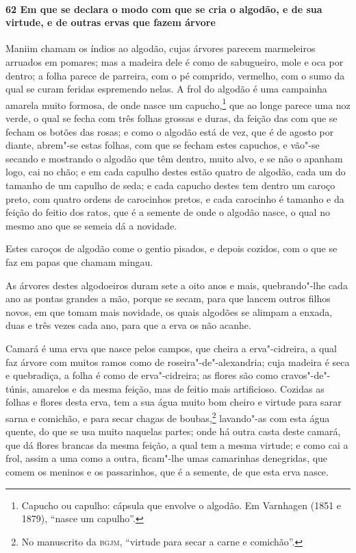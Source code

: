 \begin{linenumbers}
\paragraph{62 Em que se declara o modo com que se cria o algodão, e de sua virtude, e de
outras ervas que fazem árvore}\quad
Maniim chamam os índios ao algodão, cujas árvores parecem marmeleiros arruados em pomares;
mas a madeira dele é como de sabugueiro, mole e oca por dentro; a folha parece de
parreira, com o pé comprido, vermelho, com o sumo da qual se curam feridas espremendo
nelas. A frol do algodão é uma campainha amarela muito formosa, de onde nasce um
capucho,\footnote{ Capucho ou capulho: cápsula que envolve o algodão. 
Em Varnhagen (1851 e 1879), ``nasce um capulho''.} que ao longe parece
uma noz verde, o qual se fecha com três folhas grossas e duras, da feição das com que se
fecham os botões das rosas; e como o algodão está de vez, que é de agosto por diante,
abrem"-se estas folhas, com que se fecham estes capuchos, e vão"-se secando e mostrando o
algodão que têm dentro, muito alvo, e se não o apanham logo, cai no chão; e em cada
capulho destes estão quatro de algodão, cada um do tamanho de um capulho de seda; e cada
capucho destes tem dentro um caroço preto, com quatro ordens de carocinhos pretos, e cada
carocinho é tamanho e da feição do feitio dos ratos, que é a semente de onde o algodão
nasce, o qual no mesmo ano que se semeia dá a novidade.

Estes caroços de algodão come o gentio pisados, e depois cozidos, com o que se faz em
papas que chamam mingau.

As árvores destes algodoeiros duram sete a oito anos e mais, quebrando"-lhe cada ano as
pontas grandes a mão, porque se secam, para que lancem outros filhos novos, em que tomam
mais novidade, os quais algodões se alimpam a enxada, duas e três vezes cada ano, para que
a erva os não acanhe.

Camará é uma erva que nasce pelos campos, que cheira a erva"-cidreira, a qual faz árvore
com muitos ramos como de roseira"-de"-alexandria; cuja madeira é seca e quebradiça, a folha
é como de erva"-cidreira; as flores são como cravos"-de"-túnis, amarelos e da mesma feição,
mas de feitio mais artificioso. Cozidas as folhas e flores desta erva, tem a sua água
muito bom cheiro e virtude para sarar sarna e comichão, e para secar chagas de
boubas,\footnote{ No manuscrito da \textsc{bgjm}, ``virtude para secar a carne e
comichão''.} lavando"-as com esta água quente, do que se usa muito naquelas partes; onde há
outra casta deste camará, que dá flores brancas da mesma feição, a qual tem a mesma
virtude; e como cai a frol, assim a uma como a outra, ficam"-lhe umas camarinhas
denegridas, que comem os meninos e os passarinhos, que é a semente, de que esta erva
nasce.


\end{linenumbers}
